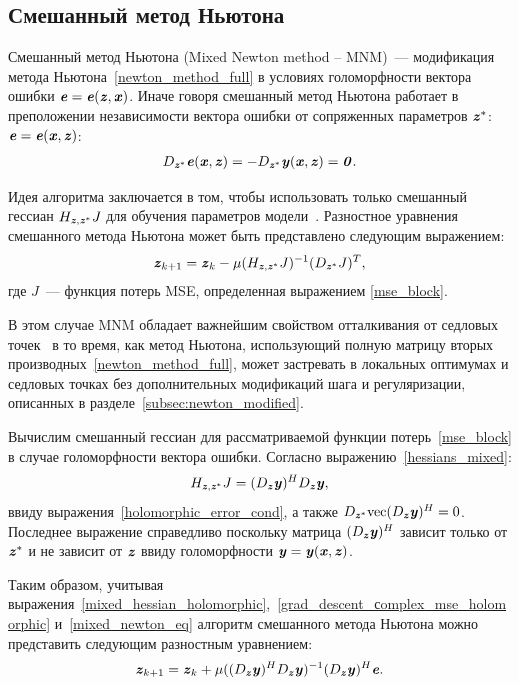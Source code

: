 \subsection{Смешанный метод Ньютона} \label{subsec:mnm}

Смешанный метод Ньютона (Mixed Newton method -- MNM)~--- модификация метода Ньютона~\eqref{newton_method_full} в условиях голоморфности вектора ошибки $\textbf{\textit{e}}=\textbf{\textit{e}}(\textbf{\textit{z}}, \textbf{\textit{x}})$. Иначе говоря смешанный метод Ньютона работает в преположении независимости вектора ошибки от сопряженных параметров $\textbf{\textit{z}}^*$: $\textbf{\textit{e}}=\textbf{\textit{e}}(\textbf{\textit{x}}, \textbf{\textit{z}})$:
\begin{align}
	D_{\textbf{\textit{z}}^*}\textbf{\textit{e}}(\textbf{\textit{x}}, \textbf{\textit{z}})=-D_{\textbf{\textit{z}}^*}\textbf{\textit{y}}(\textbf{\textit{x}}, \textbf{\textit{z}})=\textbf{\textit{0}}.
	\label{holomorphic_error_cond}
\end{align}

Идея алгоритма заключается в том, чтобы использовать только смешанный гессиан $H_{\textbf{\textit{z}}, \textbf{\textit{z}}^*}J$ для обучения параметров модели~\cite{mixed_newton}. Разностное уравнения смешанного метода Ньютона может быть представлено следующим выражением:
\begin{equation}
	\textbf{\textit{z}}_{k+1}=\textbf{\textit{z}}_k-\mu (H_{\textbf{\textit{z}}, \textbf{\textit{z}}^*} J)^{-1}(D_{\textbf{\textit{z}}^*}J)^T,
	\label{mixed_newton_eq}
\end{equation}
где $J$~--- функция потерь MSE, определенная выражением \eqref{mse_block}.

В этом случае MNM обладает важнейшим свойством отталкивания от седловых точек~\cite{mixed_newton} в то время, как метод Ньютона, использующий полную матрицу вторых производных~\eqref{newton_method_full}, может застревать в локальных оптимумах и седловых точках без дополнительных модификаций шага и регуляризации, описанных в разделе~\ref{subsec:newton_modified}.

Вычислим смешанный гессиан для рассматриваемой функции потерь~\eqref{mse_block} в случае голоморфности вектора ошибки. Согласно выражению~\eqref{hessians_mixed}:
\begin{equation}
	H_{\textbf{\textit{z}}, \textbf{\textit{z}}^*}J=(D_{\textbf{\textit{z}}}\textbf{\textit{y}})^HD_{\textbf{\textit{z}}}\textbf{\textit{y}},
	\label{mixed_hessian_holomorphic}
\end{equation}
ввиду выражения~\eqref{holomorphic_error_cond}, а также $D_{\textbf{\textit{z}}^*}\text{vec}(D_{\textbf{\textit{z}}}\textbf{\textit{y}})^H=0$. Последнее выражение справедливо поскольку матрица $(D_{\textbf{\textit{z}}}\textbf{\textit{y}})^H$ зависит только от $\textbf{\textit{z}}^*$ и не зависит от $\textbf{\textit{z}}$ ввиду голоморфности $\textbf{\textit{y}}=\textbf{\textit{y}}(\textbf{\textit{x}}, \textbf{\textit{z}})$.

Таким образом, учитывая выражения~\eqref{mixed_hessian_holomorphic},~\eqref{grad_descent_сomplex_mse_holomorphic} и~\eqref{mixed_newton_eq} алгоритм смешанного метода Ньютона можно представить следующим разностным уравнением:
\begin{equation}
	\textbf{\textit{z}}_{k+1}=\textbf{\textit{z}}_k+\mu ((D_{\textbf{\textit{z}}}\textbf{\textit{y}})^HD_{\textbf{\textit{z}}}\textbf{\textit{y}})^{-1}(D_{\textbf{\textit{z}}}\textbf{\textit{y}})^H\textbf{\textit{e}}.
	\label{mixed_newton_eq_jac}
\end{equation}

